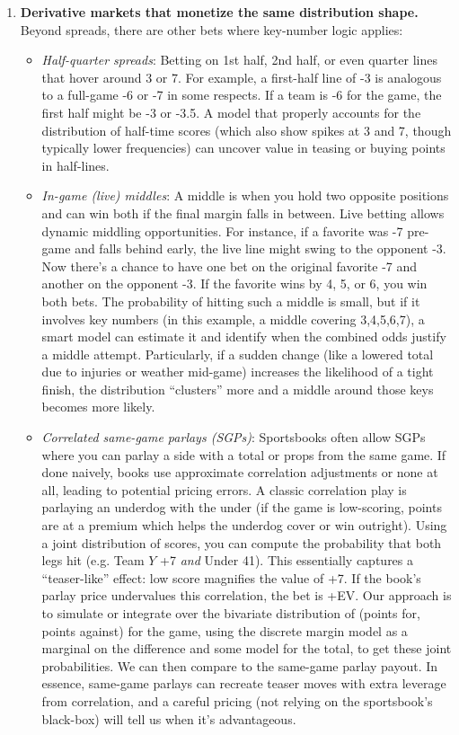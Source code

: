 \documentclass[12pt]{article}
\begin{document}
\begin{enumerate}
    \item \textbf{Derivative markets that monetize the same distribution shape.} Beyond spreads, there are other bets where key-number logic applies:
    \begin{itemize}
        \item \emph{Half-quarter spreads}: Betting on 1st half, 2nd half, or even quarter lines that hover around 3 or 7. For example, a first-half line of -3 is analogous to a full-game -6 or -7 in some respects. If a team is -6 for the game, the first half might be -3 or -3.5. A model that properly accounts for the distribution of half-time scores (which also show spikes at 3 and 7, though typically lower frequencies) can uncover value in teasing or buying points in half-lines.
        \item \emph{In-game (live) middles}: A middle is when you hold two opposite positions and can win both if the final margin falls in between. Live betting allows dynamic middling opportunities. For instance, if a favorite was -7 pre-game and falls behind early, the live line might swing to the opponent -3. Now there’s a chance to have one bet on the original favorite -7 and another on the opponent -3. If the favorite wins by 4, 5, or 6, you win both bets. The probability of hitting such a middle is small, but if it involves key numbers (in this example, a middle covering 3,4,5,6,7), a smart model can estimate it and identify when the combined odds justify a middle attempt. Particularly, if a sudden change (like a lowered total due to injuries or weather mid-game) increases the likelihood of a tight finish, the distribution “clusters” more and a middle around those keys becomes more likely.
        \item \emph{Correlated same-game parlays (SGPs)}: Sportsbooks often allow SGPs where you can parlay a side with a total or props from the same game. If done naively, books use approximate correlation adjustments or none at all, leading to potential pricing errors. A classic correlation play is parlaying an underdog with the under (if the game is low-scoring, points are at a premium which helps the underdog cover or win outright). Using a joint distribution of scores, you can compute the probability that both legs hit (e.g. Team $Y$ +7 \emph{and} Under 41). This essentially captures a “teaser-like” effect: low score magnifies the value of +7. If the book’s parlay price undervalues this correlation, the bet is +EV. Our approach is to simulate or integrate over the bivariate distribution of (points for, points against) for the game, using the discrete margin model as a marginal on the difference and some model for the total, to get these joint probabilities. We can then compare to the same-game parlay payout. In essence, same-game parlays can recreate teaser moves with extra leverage from correlation, and a careful pricing (not relying on the sportsbook’s black-box) will tell us when it’s advantageous.
    \end{itemize}


\end{enumerate}
\end{document}
